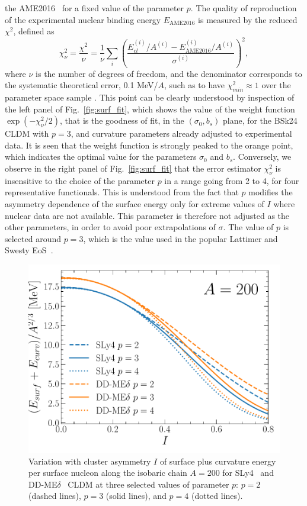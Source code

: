 the AME2016~\cite{Huang2017} for a fixed value of the parameter $p$. {The
  quality of reproduction of the experimental nuclear binding energy
  $E_{\text{AME2016}}$ is measured by the reduced $\chi^2$, defined as
  \begin{equation}
    \chi^2_\nu = \frac{\chi^2}{\nu} = \frac{1}{\nu}
    \sum_i\left(\frac{E_{cl}^{(i)}/A^{(i)}-E_{\text{AME2016}}^{(i)}/A^{(i)}}
    {\sigma^{(i)}}\right)^2,\label{eq:chi2}
  \end{equation}
  where $\nu$ is the number of degrees of freedom, and the denominator
  corresponds to the systematic theoretical error, 0.1 MeV/$A$, such as to have
  $\chi^2_{min} \approx 1$ over the parameter space 
  sample \cite{Dobaczewski2014}. 
  This point can be clearly understood by inspection of the left panel of
Fig.~\ref{fig:surf_fit}, which shows the value of the weight function 
$\exp(-\chi^2_\nu/2)$, that is the goodness of fit, in the 
$(\sigma_0,b_s)$ plane, for the BSk24 CLDM with 
$p=3$, and curvature parameters already adjusted to experimental data. It is
seen that the weight function is strongly peaked to the orange point, which
indicates the optimal value for the parameters $\sigma_0$ and $b_s$.
Conversely, we observe in the right panel of Fig.~\ref{fig:surf_fit} that the 
error estimator $\chi^2_\nu$ is insensitive to the choice of the parameter $p$ 
in a range going from 2 to 4, for four representative functionals. This is
understood from the fact that $p$ modifies the asymmetry dependence of the
surface energy only for extreme values of $I$ where nuclear data are not
available.} This parameter 
is {therefore} not adjusted as the other parameters, in order to avoid 
poor extrapolations of $\sigma$. The value of $p$ is selected around $p=3$, 
which is the value used in the popular Lattimer and Swesty EoS~\cite{Lattimer1991}.
%
\begin{figure}[!t]
\begin{center}
  \includegraphics[width=0.8\linewidth]{figures/surfenpersurfnuc.pdf}
\end{center}
\caption[Surface plus curvature energy per surface nucleon versus asymmetry]{Variation 
  with cluster asymmetry $I$ of surface plus curvature energy per
  surface nucleon along the isobaric chain $A=200$ for SLy4~\cite{Chabanat1998} and
DD-ME$\delta$~\cite{RocaMaza2011} CLDM at three selected 
values of parameter $p$: $p=2$ (dashed lines), $p=3$ (solid lines), and $p=4$
(dotted lines).}\label{fig:surfenpersurfnuc}
\end{figure}
